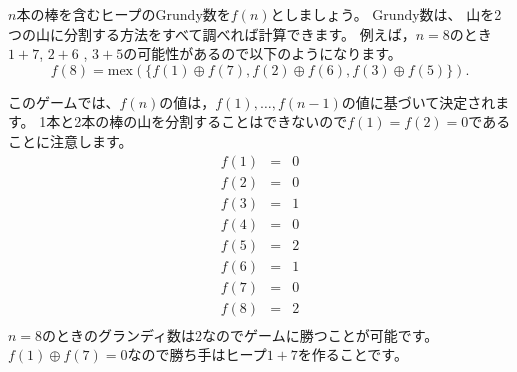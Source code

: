 $n$本の棒を含むヒープのGrundy数を$f (n)$としましょう。
Grundy数は、
山を2つの山に分割する方法をすべて調べれば計算できます。
例えば，$n = 8$のとき$1+7$, $2+6$ , $3+5$の可能性があるので以下のようになります。
\[f(8)=\textrm{mex}(\{f(1) \oplus f(7), f(2) \oplus f(6), f(3) \oplus f(5)\}).\]

このゲームでは、$f (n)$の値は，$f(1),\ldots,f(n-1)$の値に基づいて決定されます。
1本と2本の棒の山を分割することはできないので$f(1)=f(2)=0$であることに注意します。
\[
\begin{array}{lcl}
f(1) & = & 0 \\
f(2) & = & 0 \\
f(3) & = & 1 \\
f(4) & = & 0 \\
f(5) & = & 2 \\
f(6) & = & 1 \\
f(7) & = & 0 \\
f(8) & = & 2 \\
\end{array}
\]
$n=8$のときのグランディ数は2なのでゲームに勝つことが可能です。
$f(1) \oplus f(7) = 0$なので勝ち手はヒープ$1+7$を作ることです。
